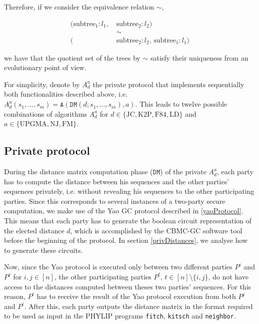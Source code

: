 \begin{itemize}
    Therefore, if we consider the equivalence relation $\sim$,
    
    \begin{equation*}
    \begin{split}
    (\text{subtree}_1:l_1,\, &\text{subtree}_2:l_2)\\
    &\sim \\
    (&\text{subtree}_2:l_2,\, \text{subtree}_1:l_1)
    \end{split}
    \end{equation*}
    

    we have that the quotient set of the trees by $\sim$ satisfy their uniqueness from an evolutionary point of view.

   
\end{itemize}

For simplicity, denote by $A_d^a$ the private protocol that implements sequentially both functionalities described above, i.e. $A_d^a(s_1, ... , s_m) = \mathtt{A}( \mathtt{DM}(d; s_1, ..., s_m), a)$. This leads to twelve possible combinations of algorithms $A_d^a$ for $d\in\{\text{JC}, \text{K2P}, \text{F84}, \text{LD}\}$ and $a \in \{\text{UPGMA}, \text{NJ}, \text{FM}\}$.

\subsection{Private protocol}

During the distance matrix computation phase ($\mathtt{DM}$) of the private $A_d^a$, each party has to compute the distance between his sequences and the other parties' sequences privately, i.e. without revealing his sequences to the other participating parties. Since this corresponds to several instances of a two-party secure computation, we make use of the Yao GC protocol described in \ref{yaoProtocol}. This means that each party has to generate the boolean circuit representation of the elected distance $d$, which is accomplished by the CBMC-GC software tool before the beginning of the protocol. In section \ref{privDistances}, we analyse how to generate these circuits.

Now, since the Yao protocol is executed only between two different parties $P^i$ and $P^j$ for $i, j \in[n]$, the other participating parties $P^t$, $t\in[n]\setminus \{i,j\}$, do not have access to the distances computed between theses two parties' sequences. For this reason, $P^t$ has to receive the result of the Yao protocol execution from both $P^j$ and $P^i$. After this, each party outputs the distance matrix in the format required to be used as input in the PHYLIP programs \texttt{fitch}, \texttt{kitsch} and \texttt{neighbor}. 


